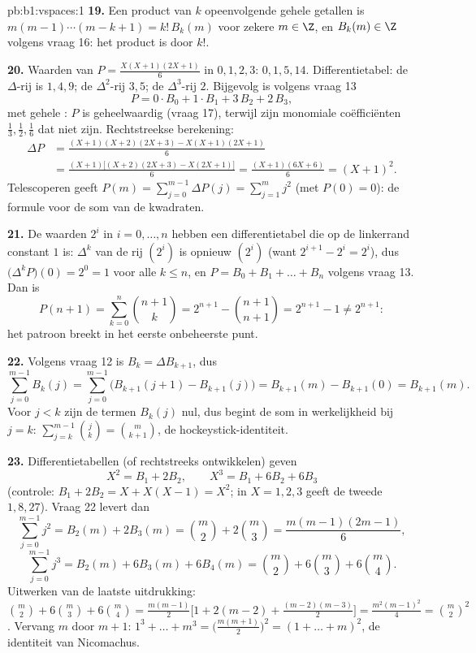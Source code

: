 \begin{solution}{pb:b1:vspaces:1}
\textbf{19.} Een product van $k$ opeenvolgende gehele getallen is
$m(m-1)\cdots(m-k+1) = k!\,B_k(m)$ voor zekere $m \in \Z$, en
$B_k(m) \in \Z$ volgens vraag 16: het product is  door
$k!$.

\textbf{20.} Waarden van $P = \frac{X(X+1)(2X+1)}{6}$ in $0,1,2,3$:
$0, 1, 5, 14$. Differentietabel: de $\Delta$-rij is $1, 4, 9$; de
$\Delta^2$-rij $3, 5$; de $\Delta^3$-rij $2$. Bijgevolg is volgens
vraag 13
\[
P = 0\cdot B_0 + 1\cdot B_1 + 3\,B_2 + 2\,B_3 ,
\]
met gehele : $P$ is geheelwaardig (vraag 17), terwijl
zijn monomiale coëfficiënten $\frac13, \frac12, \frac16$ dat niet
zijn. Rechtstreekse berekening:
\begin{align*}
\Delta P &= \frac{(X+1)(X+2)(2X+3) - X(X+1)(2X+1)}{6} \\
&= \frac{(X+1)\bigl[(X+2)(2X+3) - X(2X+1)\bigr]}{6}
= \frac{(X+1)(6X+6)}{6} = (X+1)^2 .
\end{align*}
Telescoperen geeft $P(m) = \sum_{j=0}^{m-1}\Delta P(j) =
\sum_{j=1}^{m} j^2$ (met $P(0) = 0$): de formule voor de som van de
kwadraten.

\textbf{21.} De waarden $2^i$ in $i = 0, \dots, n$ hebben een
differentietabel die op de linkerrand constant $1$ is: $\Delta^k$
van de rij $(2^i)$ is opnieuw $(2^i)$ (want $2^{i+1} - 2^i = 2^i$),
dus $\bigl(\Delta^k P\bigr)(0) = 2^0 = 1$ voor alle $k \leq n$, en
$P = B_0 + B_1 + \dots + B_n$ volgens vraag 13. Dan is
\[
P(n+1) = \sum_{k=0}^{n}\binom{n+1}{k}
= 2^{n+1} - \binom{n+1}{n+1} = 2^{n+1} - 1 \neq 2^{n+1}:
\]
het patroon breekt in het eerste onbeheerste punt.

\textbf{22.} Volgens vraag 12 is $B_k = \Delta B_{k+1}$, dus
\[
\sum_{j=0}^{m-1} B_k(j)
= \sum_{j=0}^{m-1}\bigl(B_{k+1}(j+1) - B_{k+1}(j)\bigr)
= B_{k+1}(m) - B_{k+1}(0) = B_{k+1}(m).
\]
Voor $j < k$ zijn de termen $B_k(j)$ nul, dus begint de som in
werkelijkheid bij $j = k$: $\sum_{j=k}^{m-1}\binom jk = \binom
m{k+1}$, de hockeystick-identiteit.

\textbf{23.} Differentietabellen (of rechtstreeks ontwikkelen)
geven
\[
X^2 = B_1 + 2 B_2, \qquad X^3 = B_1 + 6 B_2 + 6 B_3
\]
(controle: $B_1 + 2B_2 = X + X(X-1) = X^2$; in $X = 1, 2, 3$ geeft
de tweede $1, 8, 27$). Vraag 22 levert dan
\[
\sum_{j=0}^{m-1} j^2 = B_2(m) + 2B_3(m)
= \binom m2 + 2\binom m3 = \frac{m(m-1)(2m-1)}{6},
\]
\[
\sum_{j=0}^{m-1} j^3 = B_2(m) + 6B_3(m) + 6B_4(m)
= \binom m2 + 6\binom m3 + 6\binom m4 .
\]
Uitwerken van de laatste uitdrukking: $\binom m2 + 6\binom m3 +
6\binom m4 = \frac{m(m-1)}{2}\bigl[1 + 2(m-2) +
\frac{(m-2)(m-3)}{2}\bigr] = \frac{m^2(m-1)^2}{4} = \binom m2^2$.
Vervang $m$ door $m + 1$: $1^3 + \dots + m^3 =
\bigl(\frac{m(m+1)}2\bigr)^2 = (1 + \dots + m)^2$, de identiteit
van Nicomachus.


\end{solution}
